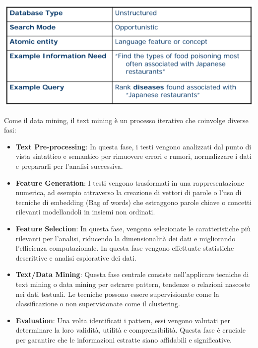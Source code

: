 \documentclass{report}
\begin{document}
	\begin{center}
		\includegraphics[scale=0.5]{assets/textmining.png}
	\end{center}
	Come il data mining, il text mining è un processo iterativo che coinvolge diverse fasi:
	\begin{itemize}
		\item \textbf{Text Pre-processing}: In questa fase, i testi vengono analizzati dal punto di vista sintattico e semantico per rimuovere errori e rumori, normalizzare i dati e prepararli per l'analisi successiva.
		\item \textbf{Feature Generation}: I testi vengono trasformati in una rappresentazione numerica, ad esempio attraverso la creazione di vettori di parole o l'uso di tecniche di embedding (Bag of words) che estraggono parole chiave o concetti rilevanti modellandoli in insiemi non ordinati.
		\item \textbf{Feature Selection}: In questa fase, vengono selezionate le caratteristiche più rilevanti per l'analisi, riducendo la dimensionalità dei dati e migliorando l'efficienza computazionale. In questa fase vengono effettuate statistiche descrittive e analisi esplorative dei dati.
		\item \textbf{Text/Data Mining}: Questa fase centrale consiste nell'applicare tecniche di text mining o data mining per estrarre pattern, tendenze o relazioni nascoste nei dati testuali. Le tecniche possono essere supervisionate come la classificazione o non supervisionate come il clustering.
		\item \textbf{Evaluation}: Una volta identificati i pattern, essi vengono valutati per determinare la loro validità, utilità e comprensibilità. Questa fase è cruciale per garantire che le informazioni estratte siano affidabili e significative.
	\end{itemize}
\end{document}
